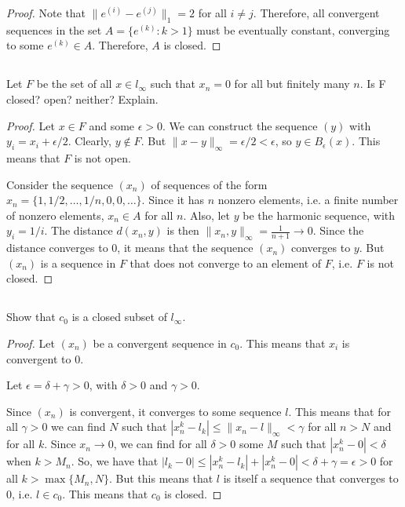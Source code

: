 \begin{proof}
Note that $\|e^{(i)}-e^{(j)}\|_1 = 2$ for all $i \neq j$. Therefore, all convergent sequences in the set $A = \{ e^{(k)} : k > 1 \}$ must be eventually constant, converging to some $e^{(k)} \in A$. Therefore, $A$ is closed.
\end{proof}

\subsection{} Let $F$ be the set of all $x \in l_\infty$ such that $x_n = 0$ for all  but finitely many $n$. Is F closed? open? neither? Explain.

\begin{proof}
Let $x \in F$ and some $\epsilon > 0$. We can construct the sequence $(y)$ with $y_i = x_i + \epsilon/2$. Clearly, $y \notin F$. But $\|x - y\|_\infty = \epsilon/2 < \epsilon$, so $y \in B_\epsilon(x)$. This means that $F$ is not open.

Consider the sequence $(x_n)$ of sequences of the form $x_n = \{1, 1/2, \dots, 1/n, 0, 0, \dots\}$. Since it has $n$ nonzero elements, i.e. a finite number of nonzero elements, $x_n \in A$ for all $n$. Also, let $y$ be the harmonic sequence, with $y_i = 1/i$. The distance $d(x_n, y)$ is then $\|x_n, y\|_\infty = \frac{1}{n+1} \rightarrow 0$. Since the distance converges to 0, it means that the sequence $(x_n)$ converges to $y$. But $(x_n)$ is a sequence in $F$ that does not converge to an element of $F$, i.e. $F$ is not closed.
\end{proof}

\subsection{} Show that $c_0$ is a closed subset of $l_\infty$.

\begin{proof}
Let $(x_n)$ be a convergent sequence in $c_0$. This means that $x_i$ is convergent to 0.

Let $\epsilon = \delta + \gamma > 0$, with $\delta > 0$ and $\gamma > 0$.

Since $(x_n)$ is convergent, it converges to some sequence $l$. This means that for all $\gamma > 0$ we can find $N$ such that $|x_n^k - l_k| \leq \|x_n - l\|_\infty < \gamma$ for all $n>N$ and for all $k$. Since $x_n \rightarrow 0$, we can find for all $\delta > 0$ some $M$ such that $|x_n^k - 0| < \delta$ when $k>M_n$. So, we have that $|l_k - 0| \leq |x_n^k - l_k| + |x_n^k - 0| < \delta + \gamma = \epsilon > 0$ for all $k > \max\{M_n, N\}$. But this means that $l$ is itself a sequence that converges to 0, i.e. $l \in c_0$. This means that $c_0$ is closed.

\end{proof}

